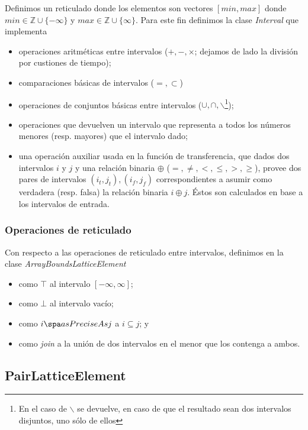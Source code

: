 \documentclass[a4paper]{article}
\begin{document}
Definimos un reticulado donde los elementos son vectores $[min,max]$ donde $min \in \mathbb{Z} \cup \{-\infty\}$ y $max \in \mathbb{Z} \cup \{\infty\}$. Para este fin definimos la clase \emph{Interval} que implementa
\begin{itemize}
\item operaciones aritméticas entre intervalos ($+,-,\times$; dejamos de lado la división por custiones de tiempo);
\item comparaciones básicas de intervalos ($=, \subset$)
\item operaciones de conjuntos básicas entre intervalos ($\cup,\cap, \smallsetminus$\footnote{En el caso de $\smallsetminus$ se devuelve, en caso de que el resultado sean dos intervalos disjuntos, uno sólo de ellos});
\item operaciones que devuelven un intervalo que representa a todos los números menores (resp. mayores) que el intervalo dado;
\item una operación auxiliar usada en la función de transferencia, que dados dos intervalos $i$ y $j$ y una relación binaria $\oplus$ ($=, \neq, <, \leq, >, \geq$), provee dos pares de intervalos $(i_t,j_t),(i_f,j_f)$ correspondientes a asumir como verdadera (resp. falsa) la relación binaria $i \oplus j$. Éstos son calculados en base a los intervalos de entrada.
\end{itemize}

\subsubsection{Operaciones de reticulado}

Con respecto a las operaciones de reticulado entre intervalos, definimos en la clase \emph{ArrayBoundsLatticeElement}

\begin{itemize}
\item como $\top$ al intervalo $[-\infty,\infty]$;
\item como $\bot$ al intervalo vacío;
\item como $i\spa asPreciseAs j$ a $i \subseteq j$; y 
\item como \emph{join} a la unión de dos intervalos en el menor que los contenga a ambos.
\end{itemize}

\subsection{PairLatticeElement}
\end{document}
